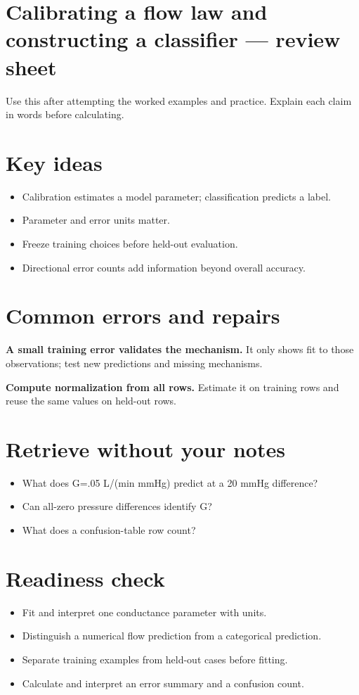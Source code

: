\documentclass[11pt,letterpaper]{article}
\theoremstyle{definition}\newtheorem{definition}{Definition}\newtheorem{example}{Example}
\numberwithin{equation}{section}
\begin{document}
\section*{Calibrating a flow law and constructing a classifier --- review sheet}
Use this after attempting the worked examples and practice. Explain each claim in words before calculating.

\section*{Key ideas}
\begin{itemize}
\item Calibration estimates a model parameter; classification predicts a label.
\item Parameter and error units matter.
\item Freeze training choices before held-out evaluation.
\item Directional error counts add information beyond overall accuracy.
\end{itemize}
\section*{Common errors and repairs}
\textbf{A small training error validates the mechanism.} It only shows fit to those observations; test new predictions and missing mechanisms.

\textbf{Compute normalization from all rows.} Estimate it on training rows and reuse the same values on held-out rows.

\section*{Retrieve without your notes}
\begin{itemize}
\item What does G=\allowbreak{}.05 L/(min mmHg) predict at a 20 mmHg difference?
\item Can all-zero pressure differences identify G?
\item What does a confusion-table row count?
\end{itemize}
\section*{Readiness check}
\begin{itemize}
\item Fit and interpret one conductance parameter with units.
\item Distinguish a numerical flow prediction from a categorical prediction.
\item Separate training examples from held-out cases before fitting.
\item Calculate and interpret an error summary and a confusion count.
\end{itemize}
\end{document}
